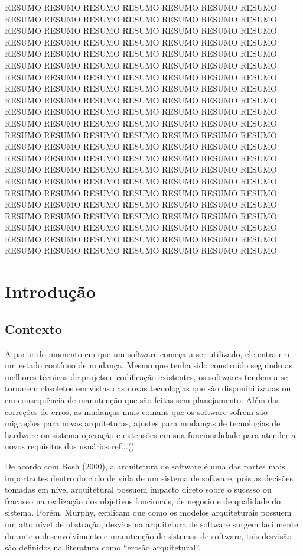 \documentclass[12pt]{article}
\begin{document}
 

\setlength{\voffset}{0cm}
\setlength{\hoffset}{0cm}



\begin{resumo}
RESUMO RESUMO RESUMO RESUMO RESUMO RESUMO RESUMO RESUMO RESUMO RESUMO RESUMO RESUMO RESUMO RESUMO RESUMO RESUMO RESUMO RESUMO RESUMO RESUMO RESUMO RESUMO RESUMO RESUMO RESUMO RESUMO RESUMO RESUMO RESUMO RESUMO RESUMO RESUMO RESUMO RESUMO RESUMO RESUMO RESUMO RESUMO RESUMO RESUMO RESUMO RESUMO RESUMO RESUMO RESUMO RESUMO RESUMO RESUMO RESUMO RESUMO RESUMO RESUMO RESUMO RESUMO RESUMO RESUMO RESUMO RESUMO RESUMO RESUMO RESUMO RESUMO RESUMO RESUMO RESUMO RESUMO RESUMO RESUMO RESUMO RESUMO RESUMO RESUMO RESUMO RESUMO RESUMO RESUMO RESUMO RESUMO RESUMO RESUMO RESUMO RESUMO RESUMO RESUMO RESUMO RESUMO RESUMO RESUMO RESUMO RESUMO RESUMO RESUMO RESUMO RESUMO RESUMO RESUMO RESUMO RESUMO RESUMO RESUMO RESUMO RESUMO RESUMO RESUMO RESUMO RESUMO RESUMO RESUMO RESUMO RESUMO RESUMO RESUMO RESUMO RESUMO RESUMO RESUMO RESUMO RESUMO RESUMO RESUMO RESUMO RESUMO RESUMO RESUMO RESUMO RESUMO RESUMO RESUMO RESUMO RESUMO RESUMO RESUMO RESUMO RESUMO RESUMO RESUMO RESUMO RESUMO RESUMO RESUMO RESUMO RESUMO RESUMO RESUMO RESUMO RESUMO RESUMO RESUMO RESUMO RESUMO RESUMO RESUMO RESUMO RESUMO 
\end{resumo}

\section{Introdução}

\subsection{Contexto}

A partir do momento em que um software começa a ser utilizado, ele entra em um estado contínuo de mudança. Mesmo que tenha sido construído seguindo as melhores técnicas de projeto e codificação existentes, os softwares tendem a se tornarem obsoletos em vistas das novas tecnologias que são disponibilizadas ou em consequência de manutenção que são feitas sem planejamento. Além das correções de erros, as mudanças mais comuns que os software sofrem são migrações para novas arquiteturas, ajustes para mudanças de tecnologias de hardware ou sistema operação e extensões em sua funcionalidade para atender a novos requisitos dos usuários ref...()

De acordo com Bosh (2000), a arquitetura de software é uma das partes mais importantes dentro do ciclo de vida de um sistema de software, pois as decisões tomadas em nível arquitetural possuem impacto direto sobre o sucesso ou fracasso na realização dos objetivos funcionais, de negocio e de qualidade do sistema. Porém, Murphy, explicam que como os modelos arquiteturais possuem um alto nível de abstração, desvios na arquitetura de software surgem facilmente durante o desenvolvimento e manutenção de sistemas de software, tais desvisão são definidos na literatura como ``erosão arquitetural''. 
\end{document}
